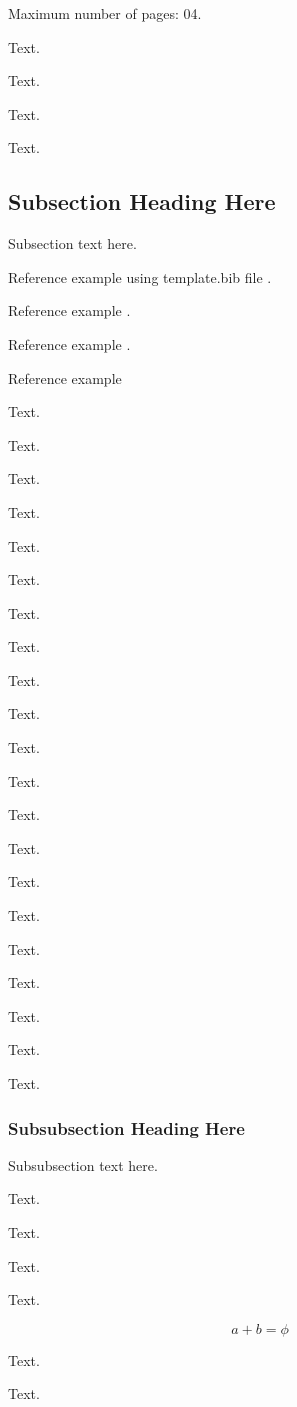 \documentclass[conference]{IEEEtran}
\begin{document}
Maximum number of pages: 04.

Text.

Text.

Text.

Text.




\subsection{Subsection Heading Here}
Subsection text here.

Reference example using template.bib file \cite{Li:2010, Alcaraz:2010}.

Reference example \cite{Intanagonwiwat:2000}.

Reference example \cite{Ibnkahla:2012}.

Reference example \cite{Afzal:2015}

Text.

Text.

Text.

Text.

Text.

Text.

Text.

Text.

Text.

Text.

Text.

Text.

Text.

Text.

Text.

Text.

Text.

Text.

Text.

Text.

Text.


\subsubsection{Subsubsection Heading Here}
Subsubsection text here.

Text.

Text.

Text.

Text.

\begin{equation}
a + b = \phi
\label{eq:01}
\end{equation}

Text.

Text.
\end{document}
